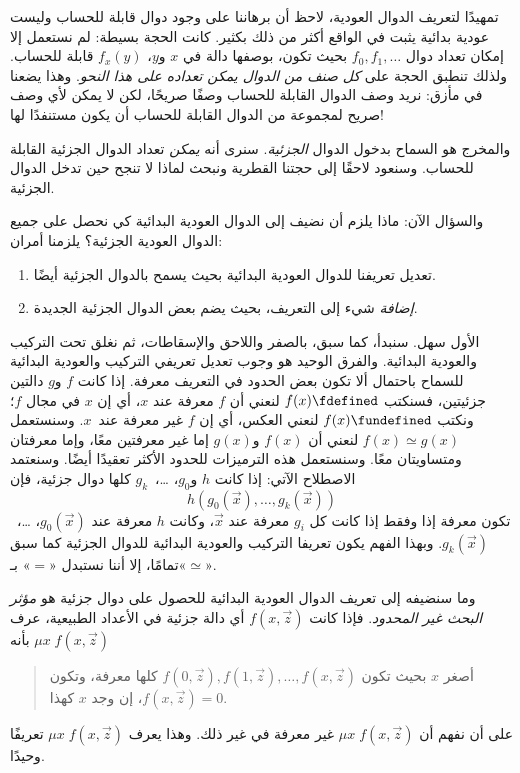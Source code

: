 \documentclass[../../../include/open-logic-section]{subfiles}
\begin{document}

تمهيدًا لتعريف الدوال العودية، لاحظ أن برهاننا على وجود دوال قابلة
للحساب وليست عودية بدائية يثبت في الواقع أكثر من ذلك بكثير. كانت الحجة
بسيطة: لم نستعمل إلا إمكان تعداد دوال $f_0,f_1,\dots$ بحيث تكون،
بوصفها دالة في $x$ و$y$، $f_x(y)$ قابلة للحساب. ولذلك تنطبق الحجة على
\emph{كل صنف من الدوال يمكن تعداده على هذا النحو}. وهذا يضعنا في
مأزق: نريد وصف الدوال القابلة للحساب وصفًا صريحًا، لكن لا يمكن لأي وصف
صريح لمجموعة من الدوال القابلة للحساب أن يكون مستنفدًا لها!

والمخرج هو السماح بدخول الدوال \emph{الجزئية}. سنرى أنه
\emph{يمكن} تعداد الدوال الجزئية القابلة للحساب.
 وسنعود لاحقًا إلى حجتنا القطرية
ونبحث لماذا لا تنجح حين تدخل الدوال الجزئية.

والسؤال الآن: ماذا يلزم أن نضيف إلى الدوال العودية البدائية كي نحصل
على جميع الدوال العودية الجزئية؟ يلزمنا أمران:
\begin{enumerate}
\item تعديل تعريفنا للدوال العودية البدائية بحيث يسمح بالدوال الجزئية
أيضًا.
\item \emph{إضافة} شيء إلى التعريف، بحيث يضم بعض الدوال الجزئية
الجديدة.
\end{enumerate}

الأول سهل. سنبدأ، كما سبق، بالصفر واللاحق والإسقاطات، ثم نغلق تحت
التركيب والعودية البدائية. والفرق الوحيد هو وجوب تعديل تعريفي التركيب
والعودية البدائية للسماح باحتمال ألا تكون بعض الحدود في التعريف معرفة.
إذا كانت $f$ و$g$ دالتين جزئيتين، فسنكتب $f(x)\fdefined$ لنعني أن
$f$ معرفة عند $x$، أي إن $x$ في مجال $f$؛ ونكتب
$f(x)\fundefined$ لنعني العكس، أي إن $f$ غير معرفة عند~$x$.
وسنستعمل $f(x)\simeq g(x)$ لنعني أن $f(x)$ و$g(x)$ إما غير معرفتين
معًا، وإما معرفتان ومتساويتان معًا. وسنستعمل هذه الترميزات للحدود
الأكثر تعقيدًا أيضًا. وسنعتمد الاصطلاح الآتي: إذا كانت $h$ و$g_0$،
…،~$g_k$ كلها دوال جزئية، فإن
\[
h(g_0(\vec x),\dots,g_k(\vec x))
\]
تكون معرفة إذا وفقط إذا كانت كل $g_i$ معرفة عند $\vec x$، وكانت $h$
معرفة عند $g_0(\vec x)$، …،~$g_k(\vec x)$. وبهذا الفهم يكون تعريفا
التركيب والعودية البدائية للدوال الجزئية كما سبق تمامًا، إلا أننا
نستبدل «$=$» بـ«$\simeq$».

وما سنضيفه إلى تعريف الدوال العودية البدائية للحصول على دوال جزئية هو
\emph{مؤثر البحث غير المحدود}. فإذا كانت $f(x,\vec z)$ أي دالة جزئية
في الأعداد الطبيعية، عرف $\mu x\;f(x,\vec z)$ بأنه
\begin{quote}
  أصغر $x$ بحيث تكون $f(0,\vec z), f(1,\vec z), \dots, f(x,\vec z)$
  كلها معرفة، وتكون $f(x,\vec z)=0$، إن وجد $x$ كهذا.
\end{quote}
على أن نفهم أن $\mu x\;f(x,\vec z)$ غير معرفة في غير ذلك. وهذا يعرف
$\mu x\;f(x,\vec z)$ تعريفًا وحيدًا.
\end{document}

